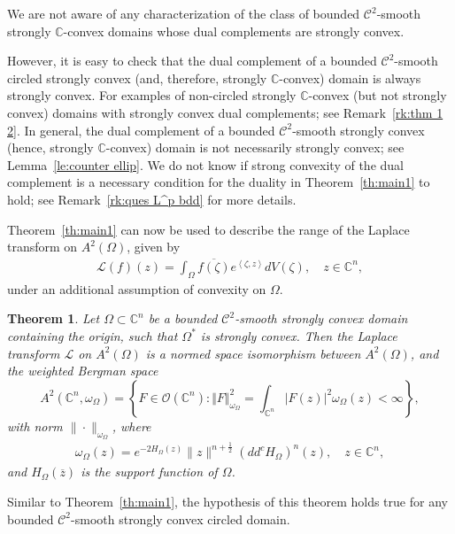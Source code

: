 \documentclass[11pt, oneside, reqno]{amsart}
\numberwithin{equation}{section}
\newtheorem{theorem}{Theorem}[section]
\theoremstyle{definition}
\newcommand{\beas}{\begin{eqnarray*}}
\newcommand{\eeas}{\end{eqnarray*}}
\newcommand{\bea} {\begin{eqnarray}}
\newcommand{\eea} {\end{eqnarray}}
\newcommand{\hol}{\mathcal {O}}
\newcommand{\cont}{\mathcal C}
\newcommand{\C}{\mathbb C}
\newcommand{\ltt}{\left(}
\newcommand{\rtt}{\right)}
\newcommand{\Om}{\Omega}
\begin{document}
We are not aware of any characterization of the class of bounded $\cont^2$-smooth strongly $\C$-convex domains whose dual complements are strongly convex. {However, it is easy to check that the dual complement of a bounded $\cont^2$-smooth circled strongly convex (and, therefore, strongly $\C$-convex) domain is always strongly convex. For examples of non-circled strongly $\C$-convex (but not strongly convex) domains with strongly convex dual complements; see Remark~\ref{rk:thm 1 2}. In general, the dual complement of a bounded $\cont^2$-smooth strongly convex (hence, strongly $\C$-convex) domain is not necessarily strongly convex; see Lemma~\ref{le:counter ellip}. 
We do not know if strong convexity of the dual complement is a necessary condition for the duality in Theorem~\ref{th:main1} to hold; see Remark~\ref{rk:ques L^p bdd} for more details.


  Theorem~\ref{th:main1} can now be used to describe the range of the Laplace transform on $A^2(\Om)$, given by
    \bea\label{eq:lap berg}
    \mathcal L(f)(z)=\int_\Om \overline{f(\zeta)} e^{\left\langle\zeta,z\right\rangle} dV(\zeta),\quad z\in\C^n,
    \eea
    under an additional assumption of convexity on $\Om$.
\begin{theorem}\label{th:PW bergman}
    Let $\Om\subset\C^n$ be a bounded $\cont^2$-smooth strongly convex domain containing the origin, such that $\Om^*$ is strongly convex. Then the Laplace transform $\mathcal L$ on $A^2(\Om)$
    is a normed space isomorphism between $A^2(\Om)$, and the weighted Bergman space
    \[    A^2(\C^n,\omega_\Om)=\left\{F\in\hol(\C^n):\Vert F\Vert_{\omega_\Om}^2=\int_{\C^n}|F(z)|^2 \omega_\Om(z)<\infty\right\},
    \]
  with norm $\|\cdot\|_{\omega_\Om}$, where 
  \beas
  \omega_\Omega(z)=e^{-2H_\Om(z)}\|z\|^{n+\frac{1}{2}} \ltt dd^cH_\Om\rtt^n(z),\quad z\in\C^n,
  \eeas
  and $H_\Om(\overline z)$ is the support function of $\Om$.
\end{theorem}

Similar to Theorem~\ref{th:main1}, the hypothesis of this theorem holds true for any bounded $\cont^2$-smooth strongly convex circled domain.

}
\end{document}
